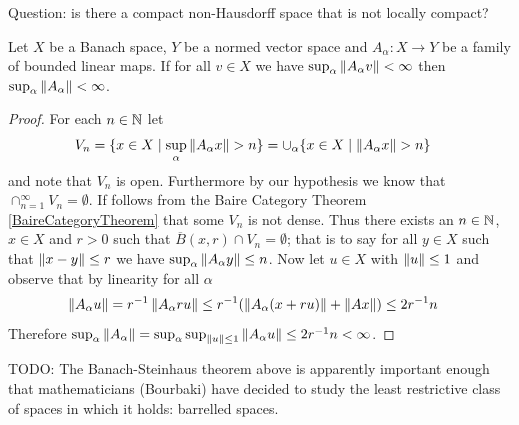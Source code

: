 Question: is there a compact non-Hausdorff space that is not locally compact?

\begin{thm}\label{PrincipleOfUniformBoundedness}Let $X$ be a Banach space, $Y$ be a normed vector space and
  $A_\alpha : X \to Y$ be a family of bounded linear maps.  If for all
  $v \in X$ we have $\sup_\alpha \left \lVert A_\alpha v \right \rVert <\infty$ then
  $\sup_\alpha \left \lVert A_\alpha \right \rVert < \infty$.
\end{thm}
\begin{proof}
For each $n \in \mathbb{N}$ let 
\begin{align*}
V_n &= \lbrace x \in X \mid \sup_\alpha
\left \lVert A_\alpha x \right \rVert > n \rbrace
= \cup_\alpha \lbrace x \in X \mid \left \lVert A_\alpha x \right \rVert > n \rbrace
\end{align*}
 and note that $V_n$ is open.
Furthermore by our hypothesis we know that $\cap_{n=1}^\infty V_n =
\emptyset$.  If follows from the Baire Category Theorem
\ref{BaireCategoryTheorem} that some $V_n$ is not dense.  Thus there
exists an $n \in \mathbb{N}$, $x \in X$ and $r > 0$ such that
$\overline{B}(x,r) \cap V_n = \emptyset$; that is to say for all $y
\in X$ such that $\left \lVert x-y \right \rVert \leq r$ we have $\sup_\alpha
\left \lVert A_\alpha y \right \rVert \leq n$.  
Now let $u \in X$ with
$\left \lVert u \right \rVert \leq 1$ and observe that by linearity for all $\alpha$ 
\begin{align*} 
\left \lVert A_\alpha u \right \rVert &=
r^{-1} \left \lVert A_\alpha ru \right \rVert  \leq r^{-1}( \left \lVert A_\alpha (x + ru)  \right \rVert +
                    \left \lVert A x \right \rVert) \leq 2 r^{-1} n
\end{align*}
Therefore $\sup_\alpha \left \lVert A_\alpha \right \rVert = \sup_\alpha \sup_{\left \lVert u \right \rVert
  \leq 1} \left \lVert A_\alpha u \right \rVert  \leq 2 r^{-1} n < \infty$.
\end{proof}

TODO: The Banach-Steinhaus theorem above is apparently important enough that mathematicians (Bourbaki) have decided to study the least restrictive class of spaces in which it holds: barrelled spaces.

